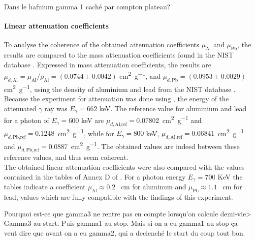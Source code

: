 Dans le hafnium gamma 1 caché par compton plateau?

\paragraph{Linear attenuation coefficients}
To analyse the coherence of the obtained attenuation coefficients \(\mu_\textrm{Al}\) and \(\mu_\textrm{Pb}\), the results are compared to the mass attenuation coefficients found in the NIST database \cite{massic-linear-attenuation}. Expressed in mass attenuation coefficients, the results are \(\mu_{d,\textrm{Al}} = \mu_{\textrm{Al}} / \rho_\textrm{Al} = \left(0.0744 \pm 0.0042\right)\) \si{\centi\meter\squared\per\gram}, and \(\mu_{d,\textrm{Pb}} = \left(0.0953 \pm 0.0029\right)\) \si{\centi\meter\squared\per\gram}, using the density of aluminium and lead from the NIST database \cite{material-density}. Because the experiment for attenuation was done using \cesium, the energy of the attenuated \(\gamma\) ray was \(E_\gamma = 662\) keV. The reference value for aluminium and lead for a photon of \(E_\gamma = 600\) keV are \mbox{\(\mu_{d,\textrm{Al,ref}} = 0.07802\) \si{\centi\meter\squared\per\gram}} and \mbox{\(\mu_{d,\textrm{Pb,ref}} = 0.1248\) \si{\centi\meter\squared\per\gram}}, while for \(E_\gamma = 800\) keV, \mbox{\(\mu_{d,\textrm{Al,ref}} = 0.06841\) \si{\centi\meter\squared\per\gram}} and \mbox{\(\mu_{d,\textrm{Pb,ref}} = 0.0887\) \si{\centi\meter\squared\per\gram}}. The obtained values are indeed between these reference values, and thus seem coherent. \\
The obtained linear attenuation coefficients were also compared 
with the values contained in the tables of Annex D of \cite{notice_generale}.
For a photon energy $E_{\gamma} = 700$ KeV the tables indicate a coefficient 
$\mu_{\mathrm{Al}} \approx 0.2$ \unit{\per\cm} for aluminum and 
$\mu_{\mathrm{Pb}} \approx 1.1$ \unit{\per\cm} for lead,
values which are fully compatible with the findings of this experiment.

Pourquoi est-ce que gamma3 ne rentre pas en compte lorsqu'on calcule demi-vie>
Gamma3 au start. Puis gamma1 au stop. Mais si on a eu gamma1 au stop ça veut dire que avant on a eu gamma2, qui a declenché le start du coup tout bon.
